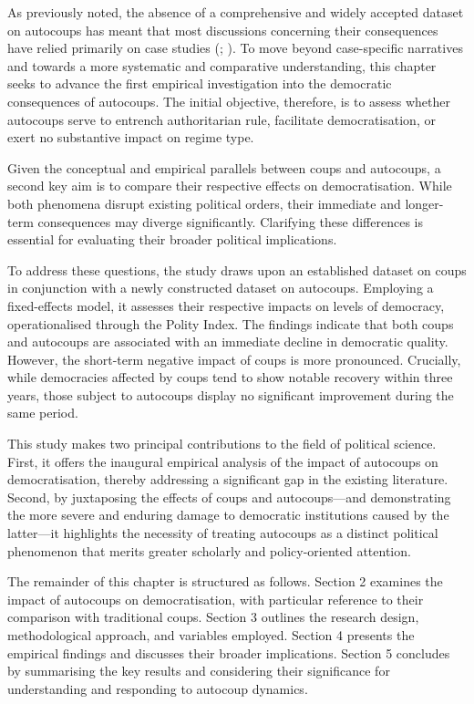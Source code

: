 \documentclass[
  12pt,
]{report}
\begin{document}
As previously noted, the absence of a comprehensive and widely accepted
dataset on autocoups has meant that most discussions concerning their
consequences have relied primarily on case studies
(;
). To move beyond
case-specific narratives and towards a more systematic and comparative
understanding, this chapter seeks to advance the first empirical
investigation into the democratic consequences of autocoups. The initial
objective, therefore, is to assess whether autocoups serve to entrench
authoritarian rule, facilitate democratisation, or exert no substantive
impact on regime type.

Given the conceptual and empirical parallels between coups and
autocoups, a second key aim is to compare their respective effects on
democratisation. While both phenomena disrupt existing political orders,
their immediate and longer-term consequences may diverge significantly.
Clarifying these differences is essential for evaluating their broader
political implications.

To address these questions, the study draws upon an established dataset
on coups in conjunction with a newly constructed dataset on autocoups.
Employing a fixed-effects model, it assesses their respective impacts on
levels of democracy, operationalised through the Polity Index. The
findings indicate that both coups and autocoups are associated with an
immediate decline in democratic quality. However, the short-term
negative impact of coups is more pronounced. Crucially, while
democracies affected by coups tend to show notable recovery within three
years, those subject to autocoups display no significant improvement
during the same period.

This study makes two principal contributions to the field of political
science. First, it offers the inaugural empirical analysis of the impact
of autocoups on democratisation, thereby addressing a significant gap in
the existing literature. Second, by juxtaposing the effects of coups and
autocoups---and demonstrating the more severe and enduring damage to
democratic institutions caused by the latter---it highlights the
necessity of treating autocoups as a distinct political phenomenon that
merits greater scholarly and policy-oriented attention.

The remainder of this chapter is structured as follows. Section 2
examines the impact of autocoups on democratisation, with particular
reference to their comparison with traditional coups. Section 3 outlines
the research design, methodological approach, and variables employed.
Section 4 presents the empirical findings and discusses their broader
implications. Section 5 concludes by summarising the key results and
considering their significance for understanding and responding to
autocoup dynamics.
\end{document}
